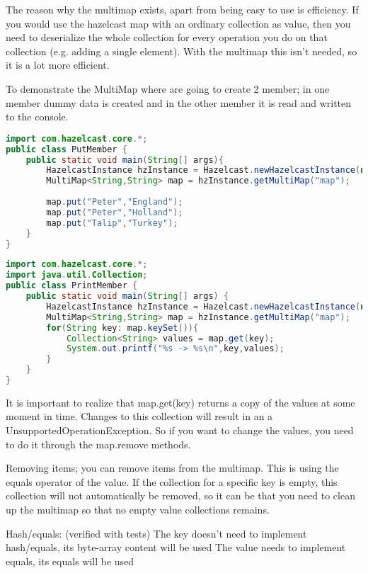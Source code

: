 The reason why the multimap exists, apart from being easy to use is efficiency. If you would use the hazelcast map with an ordinary collection as value, then you need to deserialize the whole collection for every operation you do on that collection (e.g. adding a single element). With the multimap this isn't needed, so it is a lot more efficient.

To demonstrate the MultiMap where are going to create 2 member; in one member dummy data is created and in the other member it is read and written to the console.
\begin{lstlisting}[language=java]
import com.hazelcast.core.*;
public class PutMember {
    public static void main(String[] args){
        HazelcastInstance hzInstance = Hazelcast.newHazelcastInstance(null);
        MultiMap<String,String> map = hzInstance.getMultiMap("map");
        
        map.put("Peter","England");
        map.put("Peter","Holland");
        map.put("Talip","Turkey");
    }
}
\end{lstlisting}

\begin{lstlisting}[language=java]
import com.hazelcast.core.*;
import java.util.Collection;
public class PrintMember {
    public static void main(String[] args) {
        HazelcastInstance hzInstance = Hazelcast.newHazelcastInstance(null);
        MultiMap<String,String> map = hzInstance.getMultiMap("map");
        for(String key: map.keySet()){
            Collection<String> values = map.get(key);
            System.out.printf("%s -> %s\n",key,values);
        }
    }
}
\end{lstlisting}

It is important to realize that map.get(key) returns a copy of the values at some moment in time. Changes to this collection will result in an a UnsupportedOperationException. So if you want to change the values, you need to do it through the map.remove methods.

Removing items; you can remove items from the multimap. This is using the equals operator of the value. If the collection for a specific key is empty, this collection will not automatically be removed, so it can be that you need to clean up the multimap so that no empty value collections remains.

Hash/equals: (verified with tests)
The key doesn't need to implement hash/equals, its byte-array content will be used
The value needs to implement equals, its equals will be used

